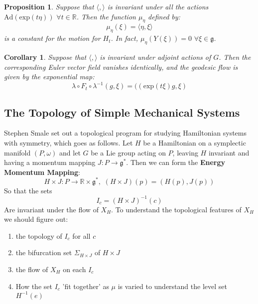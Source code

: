 \documentclass{article}
\newtheorem{prop}{Proposition}
\newtheorem{cor}{Corollary}
\begin{document}
\begin{prop}

Suppose that $\langle , \rangle$ is invariant under all the actions $\mathrm{Ad}(\mathrm{exp}(t\eta)) \hspace{4pt} \forall t \in \mathbb{R}$. Then the function $\mu_{\eta}$ defined by:
\begin{equation}
\mu_{\eta}(\xi) = \langle \eta, \xi \rangle
\end{equation}
is a constant for the motion for $H_t$. In fact, $\mu_{\eta}(Y(\xi))=0 \hspace{4pt} \forall \xi \in \mathfrak{g}$.
\end{prop}

\begin{cor}
Suppose that $\langle, \rangle$ is invariant under adjoint actions of $G$. Then the corresponding Euler vector field vanishes identically, and the geodesic flow is given by the exponential map:
\begin{equation}\lambda \circ F_t \circ \lambda^{-1} (g, \xi) = ((\mathrm{exp}(t\xi)g,\xi)\end{equation}
\end{cor}

\subsection{The Topology of Simple Mechanical Systems}

Stephen Smale set out a topological program for studying Hamiltonian systems with symmetry, which goes as follows. Let $H$ be a Hamiltonian on a symplectic manifold $(P,\omega)$ and let $G$ be a Lie group acting on $P$, leaving $H$ invariant and having a momentum mapping $J:P \to \mathfrak{g}^*$. Then we can form the \textbf{Energy Momentum Mapping}:
\begin{equation}H \times J: P \to \mathbb{R} \times \mathfrak{g}^*, \hspace{4pt} (H \times J)(p) = (H(p),J(p))\end{equation}
So that the sets 
\begin{equation}I_c = (H \times J)^{-1}(c)\end{equation}
Are invariant under the flow of $X_H$. To understand the topological features of $X_H$ we should figure out:
\begin{enumerate}
    \item the topology of $I_c$ for all $c$
    \item the bifurcation set $\Sigma_{H \times J}$ of $H \times J$
    \item the flow of $X_H$ on each $I_c$
    \item How the set $I_c$ 'fit together' as $\mu$ is varied to understand the level set $H^{-1}(e)$
\end{enumerate}
\end{document}
